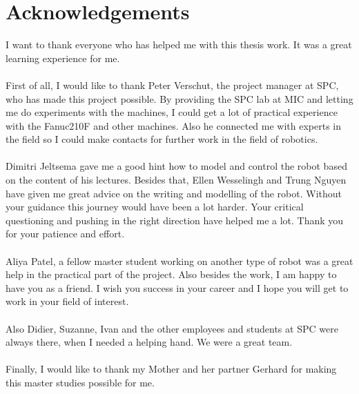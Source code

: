\chapter*{Acknowledgements}

I want to thank everyone who has helped me with this thesis work. It was a great learning experience for me.\\
\\
First of all, I would like to thank Peter Verschut, the project manager at SPC, who has made this project possible. By providing the SPC lab at MIC and letting me do experiments with the machines, I could get a lot of practical experience with the Fanuc210F and other machines. Also he connected me with experts in the field so I could make contacts for further work in the field of robotics. \\
\\
Dimitri Jeltsema gave me a good hint how to model and control the robot based on the content of his lectures. Besides that, Ellen Wesselingh and Trung Nguyen have given me great advice on the writing and modelling of the robot. Without your guidance this journey would have been a lot harder. Your critical questioning and pushing in the right direction have helped me a lot. Thank you for your patience and effort. \\
\\
Aliya Patel, a fellow master student working on another type of robot was a great help in the practical part of the project. Also besides the work, I am happy to have you as a friend. I wish you success in your career and I hope you will get to work in your field of interest.\\
\\
Also Didier, Suzanne, Ivan and the other employees and students at SPC were always there, when I needed a helping hand. We were a great team.\\
\\
Finally, I would like to thank my Mother and her partner Gerhard for making this master studies possible for me.
